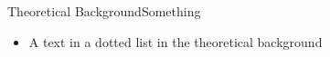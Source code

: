 \begin{frame}{Theoretical Background}{Something}
	\begin{itemize}
		\item A text in a dotted list in the theoretical background
	\end{itemize}
\end{frame}


%
